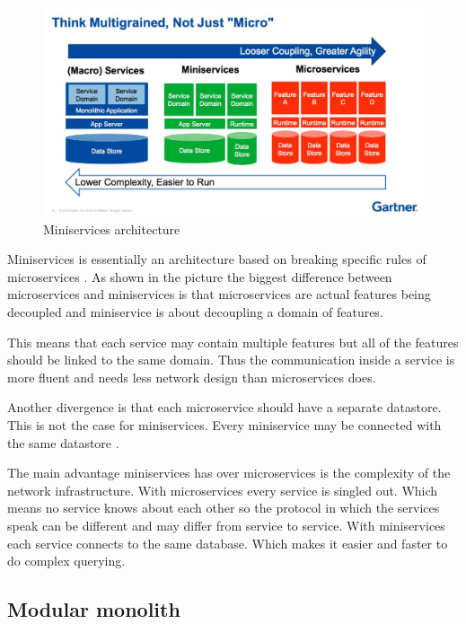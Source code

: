 \begin{figure}[H]
	\includegraphics[width=\linewidth]{miniservices.png}
        \caption{Miniservices architecture \cite{miniservicesDefinition}}
        \label{fig:MiniservicesArchitecture}
\end{figure}

Miniservices is essentially an architecture based on breaking specific rules of microservices \cite{miniservicesOrigin}. As shown in the picture the biggest difference between microservices and miniservices is that microservices are actual features being decoupled and miniservice is about decoupling a domain of features.

This means that each service may contain multiple features but all of the features should be linked to the same domain. Thus the communication inside a service is more fluent and needs less network design than microservices does.

Another divergence is that each microservice should have a separate datastore. This is not the case for miniservices. Every miniservice may be connected with the same datastore \cite{miniservicesDefinition}.

The main advantage miniservices has over microservices is the complexity of the network infrastructure. With microservices every service is singled out. Which means no service knows about each other so the protocol in which the services speak can be different and may differ from service to service. With miniservices each service connects to the same database. Which makes it easier and faster to do complex querying.

\subsection{Modular monolith}
\label{sec:ModularMonolith}


